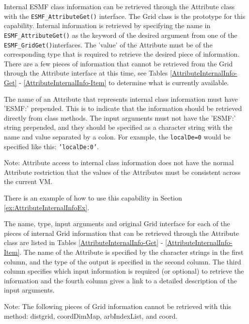 
\label{sec:InternalInfo}

Internal ESMF class information can be retrieved through the Attribute 
class with the {\tt ESMF\_AttributeGet()} interface.  The Grid class is
the prototype for this capability.  Internal information is retrieved by 
specifying the name in {\tt ESMF\_AttributeGet()} as the keyword of the 
desired argument from one of the {\tt ESMF\_GridGet()}interfaces.  
The 'value' of the Attribute must be of the corresponding type
that is required to retrieve the desired piece of information.  There are 
a few pieces of information that cannot be retrieved from the Grid
through the Attribute interface at this time, see Tables 
\ref{AttributeInternalInfo-Get} - \ref{AttributeInternalInfo-Item} to
determine what is currently available.

The name of an Attribute that represents internal class information must have 
'ESMF:' prepended.  This is to indicate that the information should be retrieved
directly from class methods.  The input arguments must not have the 'ESMF:'
string prepended, and they should be specified as a character string with the name
and value separated by a colon.  For example, the {\tt localDe=0} would be specified 
like this: {\tt 'localDe:0'}.

Note: Attribute access to internal class information does not
have the normal Attribute restriction that the values of the Attributes must be
consistent across the current VM.

There is an example of how to use this capability in Section 
\ref{ex:AttributeInternalInfoEx}.

The name, type, input arguments and original Grid interface for each of the 
pieces of internal Grid information that can be retrieved through the Attribute 
class are listed in Tables \ref{AttributeInternalInfo-Get} - 
\ref{AttributeInternalInfo-Item}.  
The name of the Attribute is specified by the character strings in the first 
column, and the type of the output is specified in the second column.
The third column specifies which input information is required (or optional) 
to retrieve the information and the fourth column gives a link to a detailed
description of the input arguments.

Note: The following pieces of Grid information cannot be retrieved with this 
method: distgrid, coordDimMap, arbIndexList, and coord.


